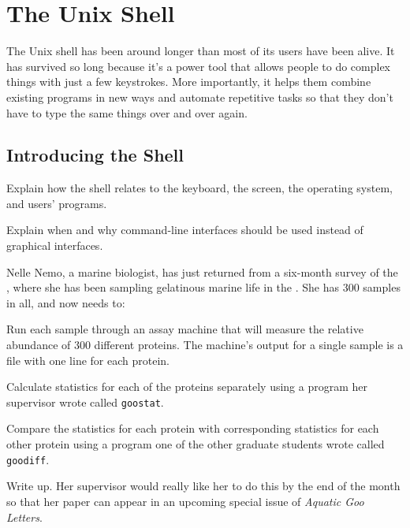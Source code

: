\chapter{The Unix Shell}\label{s:shell}

The Unix shell has been around longer than most of its users have been
alive. It has survived so long because it's a power tool that allows
people to do complex things with just a few keystrokes. More
importantly, it helps them combine existing programs in new ways and
automate repetitive tasks so that they don't have to type the same
things over and over again.

\section{Introducing the Shell}

\begin{objectives}
\begin{swcitemize}
\item
  Explain how the shell relates to the keyboard, the screen, the
  operating system, and users' programs.
\item
  Explain when and why command-line interfaces should be used instead of
  graphical interfaces.
\end{swcitemize}
\end{objectives}

Nelle Nemo, a marine biologist, has just returned from a six-month
survey of the
, where she has been sampling gelatinous marine life in the
. She has 300 samples in all, and now needs to:

\begin{swcenumerate}
\item
  Run each sample through an assay machine that will measure the
  relative abundance of 300 different proteins. The machine's output for
  a single sample is a file with one line for each protein.
\item
  Calculate statistics for each of the proteins separately using a
  program her supervisor wrote called \texttt{goostat}.
\item
  Compare the statistics for each protein with corresponding statistics
  for each other protein using a program one of the other graduate
  students wrote called \texttt{goodiff}.
\item
  Write up. Her supervisor would really like her to do this by the end
  of the month so that her paper can appear in an upcoming special issue
  of \emph{Aquatic Goo Letters}.
\end{swcenumerate}

